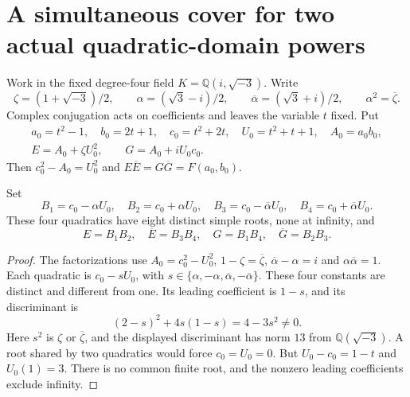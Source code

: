 \section{A simultaneous cover for two actual quadratic-domain powers}
\label{bk-section}

Work in the fixed degree-four field
$K=\mathbb Q(i,\sqrt{-3})$. Write
\[
 \zeta=(1+\sqrt{-3})/2,\qquad
 \alpha=(\sqrt3-i)/2,\qquad
 \overline\alpha=(\sqrt3+i)/2,
 \qquad \alpha^2=\overline\zeta.
\]
Complex conjugation acts on coefficients and leaves the variable $t$
fixed. Put
\begin{gather}
 a_0=t^2-1,\quad b_0=2t+1,\quad c_0=t^2+2t,\quad
 U_0=t^2+t+1,\quad A_0=a_0b_0,\label{bk-parameter}\\
 E=A_0+\zeta U_0^2,\qquad G=A_0+iU_0c_0.
 \label{bk-quadratic-elements}
\end{gather}
Then $c_0^2-A_0=U_0^2$ and
$E\overline E=G\overline G=F(a_0,b_0)$.

\begin{lemma}\label{bk-branches}
Set
\[
 B_1=c_0-\alpha U_0,\quad B_2=c_0+\alpha U_0,\quad
 B_3=c_0-\overline\alpha U_0,\quad
 B_4=c_0+\overline\alpha U_0.
\]
These four quadratics have eight distinct simple roots, none at infinity,
and
\begin{equation}\label{bk-four-factorizations}
 E=B_1B_2,\quad\overline E=B_3B_4,\quad
 G=B_1B_4,\quad\overline G=B_2B_3.
\end{equation}
\end{lemma}
\begin{proof}
The factorizations use $A_0=c_0^2-U_0^2$,
$1-\zeta=\overline\zeta$, $\overline\alpha-\alpha=i$ and
$\alpha\overline\alpha=1$. Each quadratic is $c_0-sU_0$, with
$s\in\{\alpha,-\alpha,\overline\alpha,-\overline\alpha\}$.
These four constants are distinct and different from one. Its leading
coefficient is $1-s$, and its discriminant is
\[
 (2-s)^2+4s(1-s)=4-3s^2\ne0.
\]
Here $s^2$ is $\zeta$ or $\overline\zeta$, and the displayed
discriminant has norm $13$ from $\mathbb Q(\sqrt{-3})$.
A root shared by two quadratics would force $c_0=U_0=0$.
But $U_0-c_0=1-t$ and $U_0(1)=3$. There is no common finite root,
and the nonzero leading coefficients exclude infinity.
\end{proof}

